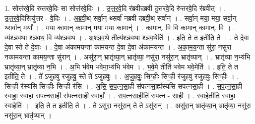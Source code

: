 \documentclass[17pt]{extarticle}
\begin{document}
1. सोत्त॑रवे॒दि रु॑त्तरवे॒दिः सा सोत्त॑रवे॒दिः । . उ॒त्त॒र॒वे॒दि र॑ब्रवीदब्रवी दुत्तरवे॒दि रु॑त्तरवे॒दि र॑ब्रवीत् । . उ॒त्त॒र॒वे॒दिरित्यु॑त्तर - वे॒दिः । . अ॒ब्र॒वी॒थ् सर्वा॒न् थ्सर्वा॑ नब्रवी दब्रवी॒थ् सर्वान्॑ । . सर्वा॒न् मया॒ मया॒ सर्वा॒न् थ्सर्वा॒न् मया᳚ । . मया॒ कामा॒न् कामा॒न् मया॒ मया॒ कामान्॑ । . कामा॒न्॒. वि वि कामा॒न् कामा॒न्॒. वि । . व्य॑श्ञवथा श्ञवथ॒ वि व्य॑श्ञवथ । . अ॒श्ञ॒व॒थे तीत्य॑श्ञवथा श्ञव॒थेति॑ । . इति॒ ते त इतीति॒ ते । . ते दे॒वा दे॒वा स्ते ते दे॒वाः । . दे॒वा अ॑कामयन्ता कामयन्त दे॒वा दे॒वा अ॑कामयन्त । . अ॒का॒म॒य॒न्ता सु॑रा॒ नसु॑रा नकामयन्ता कामय॒न्ता सु॑रान् । . असु॑रा॒न् भ्रातृ॑व्या॒न् भ्रातृ॑व्या॒ नसु॑रा॒ नसु॑रा॒न् भ्रातृ॑व्यान् । . भ्रातृ॑व्या न॒भ्य॑भि भ्रातृ॑व्या॒न् भ्रातृ॑व्या न॒भि । . अ॒भि भ॑वेम भवेमा॒भ्य॑भि भ॑वेम । . भ॒वे॒मे तीति॑ भवेम भवे॒मेति॑ । . इति॒ ते त इतीति॒ ते । . ते॑ ऽजुहवु रजुहवु॒ स्ते ते॑ ऽजुहवुः । . अ॒जु॒ह॒वुः॒ सिꣳ॒॒हीः सिꣳ॒॒ही र॑जुहवु रजुहवुः सिꣳ॒॒हीः । . सिꣳ॒॒ही र॑स्यसि सिꣳ॒॒हीः सिꣳ॒॒ही र॑सि । . अ॒सि॒ स॒प॒त्न॒सा॒ही स॑पत्नसा॒ह्य॑स्यसि सपत्नसा॒ही । . स॒प॒त्न॒सा॒ही स्वाहा॒ स्वाहा॑ सपत्नसा॒ही स॑पत्नसा॒ही स्वाहा᳚ । . स॒प॒त्न॒सा॒हीति॑ सपत्न - सा॒ही । . स्वाहेतीति॒ स्वाहा॒ स्वाहेति॑ । . इति॒ ते त इतीति॒ ते । . ते ऽसु॑रा॒ नसु॑रा॒न् ते ते ऽसु॑रान् । . असु॑रा॒न् भ्रातृ॑व्या॒न् भ्रातृ॑व्या॒ नसु॑रा॒ नसु॑रा॒न् भ्रातृ॑व्यान् । \newline
\end{document}
